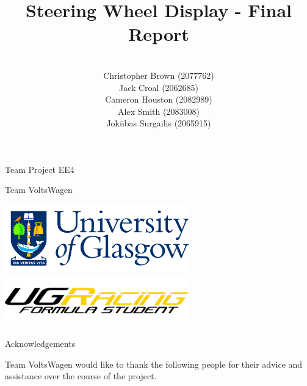 \documentclass[a4paper,12pt]{article}
\author{\vspace{1cm} \\
        Christopher Brown (2077762) \\
        Jack Croal (2062685) \\
        Cameron Houston (2082989) \\
        Alex Smith (2083008) \\
        Jok\=ubas Surgailis (2065915) \\
}
\date{}
\title{\vspace{1.0cm}Steering Wheel Display - Final Report\vspace{1.0cm}}
\begin{document}
\maketitle

\thispagestyle{empty}

\begin{center}
\Large{Team Project EE4}
\end{center}

\begin{center}
\huge{Team VoltsWagen}
\end{center}

\vspace{2.0cm}

\begin{center}
\includegraphics[width=8cm]{Figures/uni_logo.png}
\includegraphics[width=8cm]{Figures/ugr_logo_black.png}
\end{center}

\clearpage
{}



\newpage
{\Huge Acknowledgements} \\

{\large

  \vspace{1.0cm}

  Team VoltsWagen would like to thank the following people for their advice and assistance over the course of the project. \\

  \vspace{1.0cm}


}
\end{document}

